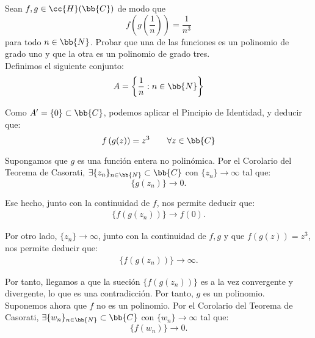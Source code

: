 \documentclass[12pt]{article}
\begin{document}
    \begin{ejercicio}[2.5 puntos]
        Sean $f, g \in \cc{H}(\bb{C})$ de modo que
        $$f\left(g\left(\frac{1}{n}\right)\right) = \frac{1}{n^3}$$
        para todo $n \in \bb{N}$.
        Probar que una de las funciones es un polinomio de grado uno y que la otra es un polinomio de grado tres.\\

        Definimos el siguiente conjunto:
        \begin{equation*}
            A = \left\{\dfrac{1}{n} : n\in \bb{N}\right\}
        \end{equation*}

        Como $A'=\{0\}\subset \bb{C}$, podemos aplicar el Pincipio de Identidad, y deducir que:
        \begin{equation*}
            f\left(g(z)\right) = z^3\qquad \forall z\in \bb{C}
        \end{equation*}

        Supongamos que $g$ es una función entera no polinómica. Por el Corolario del Teorema de Casorati, $\exists \{z_n\}_{n\in \bb{N}}\subset \bb{C}$ con $\{z_n\}\to \infty$ tal que:
        \begin{equation*}
            \{g(z_n)\} \to 0.
        \end{equation*}

        Ese hecho, junto con la continuidad de $f$, nos permite deducir que:
        \begin{align*}
            \{f(g(z_n))\}\to f(0).
        \end{align*}

        Por otro lado, $\{z_n\}\to \infty$, junto con la continuidad de $f, g$ y que $f(g(z))=z^3$, nos permite deducir que:
        \begin{align*}
            \{f(g(z_n))\}\to \infty.
        \end{align*}

        Por tanto, llegamos a que la sueción $\{f(g(z_n))\}$ es a la vez convergente y divergente, lo que es una contradicción. Por tanto, $g$ es un polinomio.\\

        Suponemos ahora que $f$ no es un polinomio. Por el Corolario del Teorema de Casorati, $\exists \{w_n\}_{n\in \bb{N}}\subset \bb{C}$ con $\{w_n\}\to \infty$ tal que:
        \begin{equation*}
            \{f(w_n)\} \to 0.
        \end{equation*}


\end{ejercicio}
\end{document}
